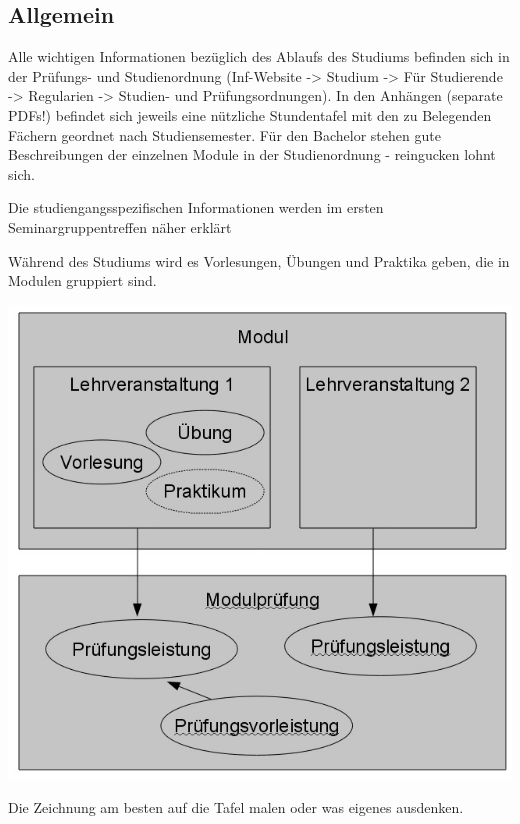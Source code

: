 \documentclass[a4paper,12pt]{report}
\begin{document}
\subsection{Allgemein}
\begin{itemize*}
\item Alle wichtigen Informationen bezüglich des Ablaufs des Studiums befinden sich in der Prüfungs- und Studienordnung (Inf-Website -> Studium -> Für Studierende -> Regularien -> Studien- und Prüfungsordnungen). In den Anhängen (separate PDFs!) befindet sich jeweils eine nützliche Stundentafel mit den zu Belegenden Fächern geordnet nach Studiensemester. Für den Bachelor stehen gute Beschreibungen der einzelnen Module in der Studienordnung - reingucken lohnt sich.
\item Die studiengangsspezifischen Informationen werden im ersten Seminargruppentreffen näher erklärt
\item Während des Studiums wird es Vorlesungen, Übungen und Praktika geben, die in Modulen gruppiert sind.

\includegraphics[width=14cm]{modul.jpg}
\begin{center}
 Die Zeichnung am besten auf die Tafel malen oder was eigenes ausdenken.
\end{center}



\end{itemize*}
\end{document}
